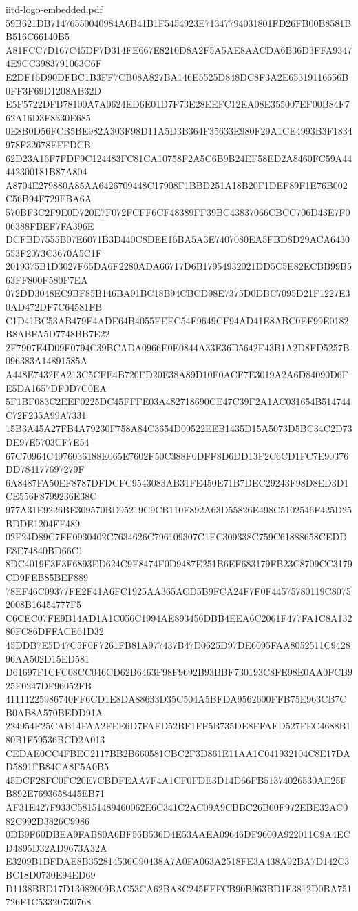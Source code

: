 \begin{filecontents*}[overwrite]{iitd-logo-embedded.pdf}
59B621DB71476550040984A6B41B1F5454923E71347794031801FD26FB00B8581BB516C66140B5
A81FCC7D167C45DF7D314FE667E8210D8A2F5A5AE8AACDA6B36D3FFA93474E9CC3983791063C6F
E2DF16D90DFBC1B3FF7CB08A827BA146E5525D848DC8F3A2E65319116656B0FF3F69D1208AB32D
E5F5722DFB78100A7A0624ED6E01D7F73E28EEFC12EA08E355007EF00B84F762A16D3F8330E685
0E8B0D56FCB5BE982A303F98D11A5D3B364F35633E980F29A1CE4993B3F1834978F32678EFFDCB
62D23A16F7FDF9C124483FC81CA10758F2A5C6B9B24EF58ED2A8460FC59A44442300181B87A804
A8704E279880A85AA6426709448C17908F1BBD251A18B20F1DEF89F1E76B002C56B94F729FBA6A
570BF3C2F9E0D720E7F072FCFF6CF48389FF39BC43837066CBCC706D43E7F006388FBEF7FA396E
DCFBD7555B07E6071B3D440C8DEE16BA5A3E7407080EA5FBD8D29ACA6430553F2073C3670A5C1F
2019375B1D3027F65DA6F2280ADA66717D6B17954932021DD5C5E82ECBB99B563FF800F580F7EA
072DD3048EC9BF85B146BA91BC18B94CBCD98E7375D0DBC7095D21F1227E30AD472DF7C64581FB
C1D41BC53AB479F4ADE64B4055EEEC54F9649CF94AD41E8ABC0EF99E0182B8ABFA5D7748BB7E22
2F7907E4D09F0794C39BCADA0966E0E0844A33E36D5642F43B1A2D8FD5257B096383A14891585A
A448E7432EA213C5CFE4B720FD20E38A89D10F0ACF7E3019A2A6D84090D6FE5DA1657DF0D7C0EA
5F1BF083C2EEF0225DC45FFFE03A482718690CE47C39F2A1AC031654B514744C72F235A99A7331
15B3A45A27FB4A79230F758A84C3654D09522EEB1435D15A5073D5BC34C2D73DE97E5703CF7E54
67C70964C4976036188E065E7602F50C388F0DFF8D6DD13F2C6CD1FC7E90376DD784177697279F
6A8487FA50EF8787DFDCFC9543083AB31FE450E71B7DEC29243F98D8ED3D1CE556F8799236E38C
977A31E9226BE309570BD95219C9CB110F892A63D55826E498C5102546F425D25BDDE1204FF489
02F24D89C7FE0930402C7634626C796109307C1EC309338C759C61888658CEDDE8E74840BD66C1
8DC4019E3F3F6893ED624C9E8474F0D9487E251B6EF683179FB23C8709CC3179CD9FEB85BEF889
78EF46C09377FE2F41A6FC1925AA365ACD5B9FCA24F7F0F44575780119C80752008B16454777F5
C6CEC07FE9B14AD1A1C056C1994AE893456DBB4EEA6C2061F477FA1C8A13280FC86DFFACE61D32
45DDB7E5D47C5F0F7261FB81A977437B47D0625D97DE6095FAA8052511C942896AA502D15ED581
D61697F1CFC08CC046CD62B6463F98F9692B93BBF730193C8FE98E0AA0FCB925F0247DF96052FB
41111225986740FF6CD1E8DA88633D35C504A5BFDA9562600FFB75E963CB7CB0AB8A570BEDD91A
224954F25CAB14FAA2FEE6D7FAFD52BF1FF5B735DE8FFAFD527FEC4688B180B1F59536BCD2A013
CEDAE0CC4FBEC2117BB2B660581CBC2F3D861E11AA1C041932104C8E17DAD5891FB84CA8F5A0B5
45DCF28FC0FC20E7CBDFEAA7F4A1CF0FDE3D14D66FB51374026530AE25FB892E7693658445EB71
AF31E427F933C58151489460062E6C341C2AC09A9CBBC26B60F972EBE32AC082C992D3826C9986
0DB9F60DBEA9FAB80A6BF56B536D4E53AAEA09646DF9600A922011C9A4ECD4895D32AD9673A32A
E3209B1BFDAE8B352814536C90438A7A0FA063A2518FE3A438A92BA7D142C3BC18D0730E94ED69
D1138BBD17D13082009BAC53CA62BA8C245FFFCB90B963BD1F3812D0BA751726F1C53320730768

\end{filecontents*}
